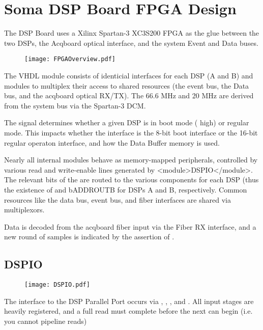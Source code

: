 

\section{Soma DSP Board FPGA Design}


  The DSP Board uses a Xilinx Spartan-3 XC3S200 FPGA as the glue
  between the two DSPs, the Acqboard optical interface, and the system
  Event and Data buses.
  
  \begin{figure}
  \texttt{[image: FPGAOverview.pdf]}
  \end{figure}

  The VHDL module consists of identicial interfaces for each DSP (A
  and B) and modules to multiplex their access to shared resources
  (the event bus, the Data bus, and the acqboard optical RX/TX). The
  66.6 MHz  and 20 MHz 
  are derived from the system bus  via the
  Spartan-3 DCM.
    
  
  The  signal determines whether a given DSP is
  in boot mode ( high) or regular mode. This
  impacts whether the interface is the 8-bit boot interface or the
  16-bit regular operaton interface, and how the Data Buffer memory is
  used.
  
  Nearly all internal modules behave as memory-mapped peripherals,
  controlled by various read and write-enable lines generated by
  <module>DSPIO</module>. The relevant bits of the
   are routed to the various components for each
  DSP (thus the existence of  and
  b{ADDROUTB} for DSPs A and B, respectively. Common
  resources like the data bus, event bus, and fiber interfaces are
  shared via multiplexors.
  
  Data is decoded from the acqboard fiber input via the Fiber RX
  interface, and a new round of samples is indicated by the assertion
  of .

\subsection{DSPIO}

\begin{figure}
\texttt{[image: DSPIO.pdf]}
\end{figure}

The interface to the DSP Parallel Port occurs via ,
, , and . All input stages are
heavily registered, and a full read must complete before the next can
begin (i.e. you cannot pipeline reads)

